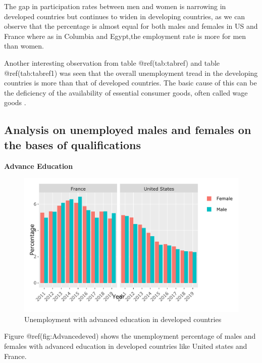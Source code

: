 \documentclass[
]{article}
\begin{document}
The gap in participation rates between men and women is narrowing in
developed countries but continues to widen in developing countries, as
we can observe that the percentage is almost equal for both males and
females in US and France where as in Columbia and Egypt,the employment
rate is more for men than women.\autocite{social}

Another interesting observation from table @ref(tab:tabref) and table
@ref(tab:tabref1) was seen that the overall unemployment tread in the
developing countries is more than that of developed countries. The basic
cause of this can be the deficiency of the availability of essential
consumer goods, often called wage goods \autocite{Education}.

\hypertarget{analysis-on-unemployed-males-and-females-on-the-bases-of-qualifications}{%
\subsection{Analysis on unemployed males and females on the bases of
qualifications}\label{analysis-on-unemployed-males-and-females-on-the-bases-of-qualifications}}

\textbf{Advance Education}

\begin{figure}
\centering
\includegraphics{The_Outsiders_5513_files/figure-latex/Advancedeved-1.pdf}
\caption{Unemployment with advanced education in developed countries}
\end{figure}

Figure @ref(fig:Advancedeved) shows the unemployment percentage of males
and females with advanced education in developed countries like United
states and France.
\end{document}
